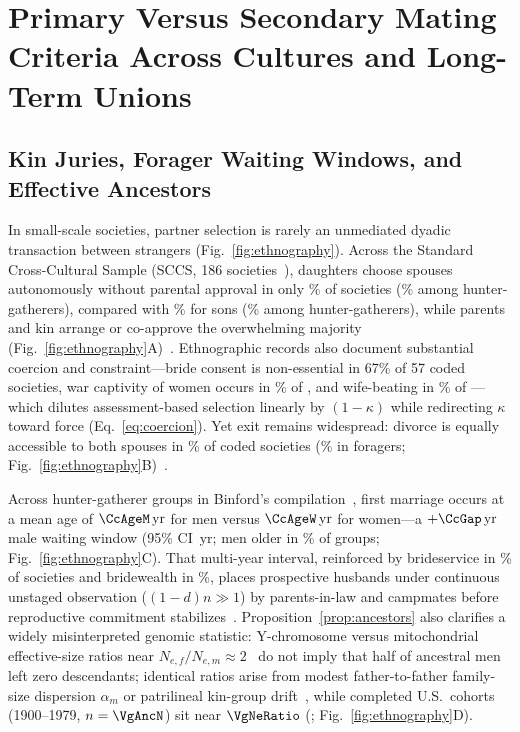 \section{Primary Versus Secondary Mating Criteria Across Cultures and Long-Term Unions}\label{sec:cultures}

\subsection{Kin Juries, Forager Waiting Windows, and Effective Ancestors}
In small-scale societies, partner selection is rarely an unmediated dyadic transaction between strangers (Fig.~\ref{fig:ethnography}). Across the Standard Cross-Cultural Sample (SCCS, 186 societies~\cite{murdock1969,kirby2016}), daughters choose spouses autonomously without parental approval in only \CcAloneW\% of societies (\CcAloneWFor\% among hunter-gatherers), compared with \CcAloneM\% for sons (\CcAloneMFor\% among hunter-gatherers), while parents and kin arrange or co-approve the overwhelming majority (Fig.~\ref{fig:ethnography}A)~\cite{apostolou2007,walker2011}. Ethnographic records also document substantial coercion and constraint---bride consent is non-essential in 67\% of 57 coded societies, war captivity of women occurs in \CcCapPct\% of \CcCapN{}, and wife-beating in \CcBeatPct\% of \CcBeatN{}---which dilutes assessment-based selection linearly by $(1-\kappa)$ while redirecting $\kappa$ toward force (Eq.~\eqref{eq:coercion}). Yet exit remains widespread: divorce is equally accessible to both spouses in \CcDivEqPct\% of coded societies (\PboCcDivEqFor\% in foragers; Fig.~\ref{fig:ethnography}B)~\cite{blurtonjones2000,scelza2013}.

Across \CcAgeN{} hunter-gatherer groups in Binford's compilation~\cite{binford2001}, first marriage occurs at a mean age of $\CcAgeM\,\mathrm{yr}$ for men versus $\CcAgeW\,\mathrm{yr}$ for women---a $+\CcGap\,\mathrm{yr}$ male waiting window (95\% CI \CcGapCI\,yr; men older in \CcMenOlderPct\% of groups; Fig.~\ref{fig:ethnography}C). That multi-year interval, reinforced by brideservice in \CcBrideService\% of societies and bridewealth in \CcBridewealth\%, places prospective husbands under continuous unstaged observation ($(1-d)n\gg 1$) by parents-in-law and campmates before reproductive commitment stabilizes~\cite{collier1981,marlowe2004}. Proposition~\ref{prop:ancestors} also clarifies a widely misinterpreted genomic statistic: Y-chromosome versus mitochondrial effective-size ratios near $N_{e,f}/N_{e,m}\approx 2$~\cite{wilder2004,karmin2015} do not imply that half of ancestral men left zero descendants; identical ratios arise from modest father-to-father family-size dispersion $\alpha_m$ or patrilineal kin-group drift~\cite{zeng2018}, while completed U.S.\ cohorts (1900--1979, $n=\VgAncN$) sit near $\VgNeRatio$ (\VgNeRatioCI; Fig.~\ref{fig:ethnography}D).

